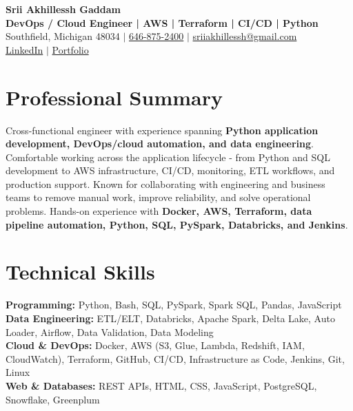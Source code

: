 \documentclass[letterpaper,10pt]{article}
\begin{document}
\fontsize{9.35pt}{10.45pt}\selectfont

\begin{center}
    {\LARGE \textbf{Srii Akhillessh Gaddam}} \\[-1pt]
    \textbf{DevOps / Cloud Engineer | AWS | Terraform | CI/CD | Python} \\[2pt]
    Southfield, Michigan 48034 $|$
    \href{tel:6468752400}{646-875-2400} $|$
    \href{mailto:sriiakhillessh@gmail.com}{sriiakhillessh@gmail.com} \\[1pt]
    \href{https://www.linkedin.com/in/srii-akhiilessh-gaddam-b48668191/}{LinkedIn} $|$
    \href{https://sriiakhillesshg.github.io/portfolio/}{Portfolio}
\end{center}
\vspace{-8pt}

\section{Professional Summary}
\small{Cross-functional engineer with experience spanning \textbf{Python application development, DevOps/cloud automation, and data engineering}. Comfortable working across the application lifecycle - from Python and SQL development to AWS infrastructure, CI/CD, monitoring, ETL workflows, and production support. Known for collaborating with engineering and business teams to remove manual work, improve reliability, and solve operational problems. Hands-on experience with \textbf{Docker, AWS, Terraform, data pipeline automation, Python, SQL, PySpark, Databricks, and Jenkins}.}

\section{Technical Skills}
\small{
\textbf{Programming:} Python, Bash, SQL, PySpark, Spark SQL, Pandas, JavaScript \\
\textbf{Data Engineering:} ETL/ELT, Databricks, Apache Spark, Delta Lake, Auto Loader, Airflow, Data Validation, Data Modeling \\
\textbf{Cloud \& DevOps:} Docker, AWS (S3, Glue, Lambda, Redshift, IAM, CloudWatch), Terraform, GitHub, CI/CD, Infrastructure as Code, Jenkins, Git, Linux \\
\textbf{Web \& Databases:} REST APIs, HTML, CSS, JavaScript, PostgreSQL, Snowflake, Greenplum
}
\end{document}
